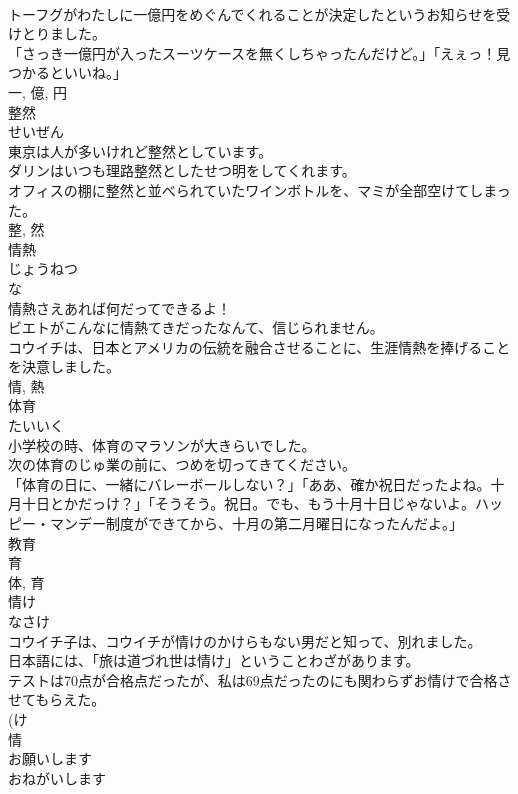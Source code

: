 \documentclass[8pt]{extreport}
\begin{document}
\begin{CJK}{UTF8}{min}
\\	トーフグがわたしに一億円をめぐんでくれることが決定したというお知らせを受けとりました。	
\\	「さっき一億円が入ったスーツケースを無くしちゃったんだけど。」「えぇっ！見つかるといいね。」	
\\	一, 億, 円	
\\	整然	
\\	せいぜん	
\\	東京は人が多いけれど整然としています。	
\\	ダリンはいつも理路整然としたせつ明をしてくれます。	
\\	オフィスの棚に整然と並べられていたワインボトルを、マミが全部空けてしまった。	
\\	整, 然	
\\	情熱	
\\	じょうねつ	
\\	な 
\\	情熱さえあれば何だってできるよ！	
\\	ビエトがこんなに情熱てきだったなんて、信じられません。	
\\	コウイチは、日本とアメリカの伝統を融合させることに、生涯情熱を捧げることを決意しました。	
\\	情, 熱	
\\	体育	
\\	たいいく	
\\	小学校の時、体育のマラソンが大きらいでした。	
\\	次の体育のじゅ業の前に、つめを切ってきてください。	
\\	「体育の日に、一緒にバレーボールしない？」「ああ、確か祝日だったよね。十月十日とかだっけ？」「そうそう。祝日。でも、もう十月十日じゃないよ。ハッピー・マンデー制度ができてから、十月の第二月曜日になったんだよ。」	
\\	教育 
\\	育 
\\	体, 育	
\\	情け	
\\	なさけ	
\\	コウイチ子は、コウイチが情けのかけらもない男だと知って、別れました。	
\\	日本語には、「旅は道づれ世は情け」ということわざがあります。	
\\	テストは70点が合格点だったが、私は69点だったのにも関わらずお情けで合格させてもらえた。	
\\	(け 
\\	情	
\\	お願いします	
\\	おねがいします	

\end{CJK}
\end{document}
